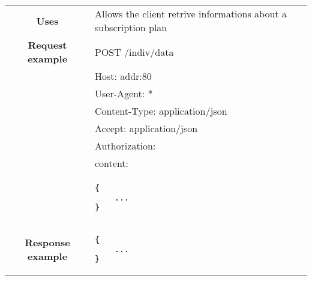 \begin{adjustwidth}{1cm}{}
\begin{longtable}{|c|l|}
\begin{minipage}[t]{0.7\textwidth}
              \end{minipage} \\
              \hline
            \textbf{Uses} & Allows the client retrive informations about a subscription plan \\
            \hline
            
                           \textbf{Request example}
             & POST /indiv/data \\
             & Host: addr:80\\
             & User-Agent: * \\
             & Content-Type: application/json\\
             & Accept: application/json\\
             & Authorization: \\
             & content: \\
            & \begin{minipage}[t]{0.5\textwidth}
                \begin{adjustwidth}{1.5cm}{}
                \begin{verbatim}
{
    ...
}
                \end{verbatim}
                \end{adjustwidth}
              \end{minipage} \\
            \hline
             \textbf{Response example} & 
              \begin{minipage}[t]{0.5\textwidth}
                \begin{adjustwidth}{1.5cm}{}
                \begin{verbatim}
{
    ...
}
                \end{verbatim}
                \end{adjustwidth}
              \end{minipage} \\
              \hline
 
 
 
        \end{longtable}
    \end{adjustwidth}
    
